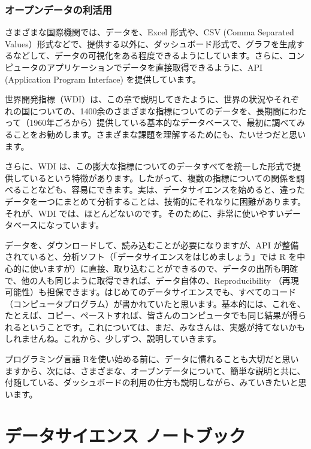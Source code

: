 \documentclass[
  xelatex, ja=standard]{bxjsbook}
\theoremstyle{definition}
\theoremstyle{definition}
\theoremstyle{definition}
\theoremstyle{definition}
\theoremstyle{remark}
\begin{document}
\hypertarget{ux30aaux30fcux30d7ux30f3ux30c7ux30fcux30bfux306eux5229ux6d3bux7528}{%
\subsection{オープンデータの利活用}\label{ux30aaux30fcux30d7ux30f3ux30c7ux30fcux30bfux306eux5229ux6d3bux7528}}

さまざまな国際機関では、データを、Excel 形式や、CSV (Comma Separated Values）形式などで、提供する以外に、ダッシュボード形式で、グラフを生成するなどして、データの可視化をある程度できるようにしています。さらに、コンピュータのアプリケーションでデータを直接取得できるように、API (Application Program Interface) を提供しています。

世界開発指標（WDI）は、この章で説明してきたように、世界の状況やそれぞれの国についての、1400余のさまざまな指標についてのデータを、長期間にわたって（1960年ごろから）提供している基本的なデータベースで、最初に調べてみることをお勧めします。さまざまな課題を理解するためにも、たいせつだと思います。

さらに、WDI は、この膨大な指標についてのデータすべてを統一した形式で提供しているという特徴があります。したがって、複数の指標についての関係を調べることなども、容易にできます。実は、データサイエンスを始めると、違ったデータを一つにまとめて分析することは、技術的にそれなりに困難があります。それが、WDI では、ほとんどないのです。そのために、非常に使いやすいデータベースになっています。

データを、ダウンロードして、読み込むことが必要になりますが、API が整備されていると、分析ソフト（「データサイエンスをはじめましょう」では R を中心的に使いますが）に直接、取り込むことができるので、データの出所も明確で、他の人も同じように取得できれば、データ自体の、Reproducibility （再現可能性）も担保できます。はじめてのデータサイエンスでも、すべてのコード（コンピュータプログラム）が書かれていたと思います。基本的には、これを、たとえば、コピー、ペーストすれば、皆さんのコンピュータでも同じ結果が得られるということです。これについては、まだ、みなさんは、実感が持てないかもしれませんね。これから、少しずつ、説明していきます。

プログラミング言語 Rを使い始める前に、データに慣れることも大切だと思いますから、次には、さまざまな、オープンデータについて、簡単な説明と共に、付随している、ダッシュボードの利用の仕方も説明しながら、みていきたいと思います。

\hypertarget{notebook}{%
\chapter{データサイエンス ノートブック}\label{notebook}}
\end{document}
